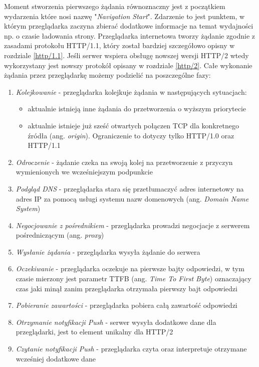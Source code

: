 \documentclass[polish, twoside, 12pt]{mwart}
\begin{document}
Moment stworzenia pierwszego żądania równoznaczny jest z początkiem wydarzenia które nosi nazwę "\emph{Navigation Start}". Zdarzenie to jest punktem, w którym przeglądarka zaczyna zbierać dodatkowe informacje na temat wydajności np. o czasie ładowania strony. Przeglądarka internetowa tworzy żądanie zgodnie z zasadami protokołu HTTP/1.1, który został bardziej szczegółowo opisny w rozdziale \ref{http/1.1}. Jeśli serwer wspiera obsługę nowszej wersji HTTP/2 wtedy wykorzystany jest nowszy protokół opisany w rozdziale \ref{http/2}. Całe wykonanie żądania przez przeglądarkę możemy podzielić na poszczególne fazy:

\begin{enumerate}
  \item \emph{Kolejkowanie} - przeglądarka kolejkuje żądania w następujących sytuacjach:
    \begin{itemize}
      \item aktualnie istnieją inne żądania do przetworzenia o wyższym priorytecie
      \item aktualnie istnieje już sześć otwartych połączen TCP dla konkretnego źródła (ang. \emph{origin}). Ograniczenie to dotyczy tylko HTTP/1.0 oraz HTTP/1.1
    \end{itemize}
  \item \emph{Odroczenie} - żądanie czeka na swoją kolej na przetworzenie z przyczyn wymienionych we wcześniejszym podpunkcie
  \item \emph{Podgląd DNS} - przeglądarka stara się przetłumaczyć adres internetowy na adres IP za pomocą usługi systemu nazw domenowych (ang. \emph{Domain Name System})
  \item \emph{Negocjowanie z pośrednikiem} - przeglądarka prowadzi negocjacje z serwerem pośredniczącym (ang. \emph{proxy})
  \item \emph{Wysłanie żądania} - przeglądarka wysyła żądanie do serwera
  \item \emph{Oczekiwanie} - przeglądarka oczekuje na pierwsze bajty odpowiedzi, w tym czasie mierzony jest parametr TTFB (ang. \emph{Time To First Byte}) oznaczający czas jaki minął zanim przeglądarka otrzymała pierwszy bajt odpowiedzi
  \item \emph{Pobieranie zawartości} - przeglądarka pobiera całą zawartość odpowiedzi
  \item \emph{Otrzymanie notyfikacji Push} - serwer wysyła dodatkowe dane dla przeglądarki, jest to element unikalny dla HTTP/2
  \item \emph{Czytanie notyfikacji Push} - przeglądarka czyta oraz interpretuje otrzymane wcześniej dodatkowe dane
\end{enumerate}
\end{document}
